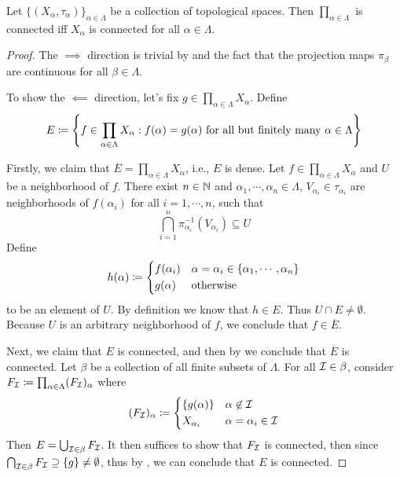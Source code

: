 \documentclass[screen]{techreport}
\numberwithin{equation}{section}
\begin{document}
\begin{theorem}\label{The:ProdConnIffEachConn}
	Let $\{(X_\alpha,\tau_\alpha)\}_{\alpha \in \Lambda}$ be a collection of topological spaces.
	Then $\prod_{\alpha \in \Lambda}$ is connected iff $X_\alpha$ is connected for all $\alpha \in \Lambda$.
\end{theorem}
\begin{proof}
	The $\implies$ direction is trivial by  and the fact that the projection maps $\pi_\beta$ are continuous for all $\beta \in \Lambda$.
	
	To show the $\impliedby$ direction, let's fix $g \in \prod_{\alpha \in \Lambda} X_\alpha$. Define
	\[
	E \coloneqq \left\{ { f \in \prod_{\alpha \in \Lambda} X_\alpha : f(\alpha)=g(\alpha)~\text{for all but finitely many $\alpha \in \Lambda$} } \right\}
	\]
	
	Firstly, we claim that $\overline{E} = \prod_{\alpha \in \Lambda} X_\alpha$, i.e., $E$ is dense.
	Let $f \in \prod_{\alpha \in \Lambda} X_\alpha$ and $U$ be a neighborhood of $f$.
	There exist $n \in \mathbb{N}$ and $\alpha_1,\cdots,\alpha_n \in \Lambda$, $V_{\alpha_i} \in \tau_{\alpha_i}$ are neighborhoods of $f(\alpha_i)$ for all $i=1,\cdots,n$, such that
	\[
	\bigcap_{i=1}^n \pi_{\alpha_i}^{-1}(V_{\alpha_i}) \subseteq U
	\]
	Define
	\[
	h(\alpha) \coloneqq \begin{dcases}
 		f(\alpha_i) & \alpha=\alpha_i  \in \{ \alpha_1,\cdots, \alpha_n \} \\
 		g(\alpha) & \text{otherwise}
 	\end{dcases}
	\]
	to be an element of $U$.
	By definition we know that $h \in E$.
	Thus $U \cap E \neq \emptyset$.
	Because $U$ is an arbitrary neighborhood of $f$, we conclude that $f \in \overline{E}$.
	
	Next, we claim that $E$ is connected, and then by  we conclude that $\overline{E}$ is connected.
	Let $\beta$ be a collection of all finite subsets of $\Lambda$.
	For all $\mathcal{I} \in \beta$, consider $F_{\mathcal{I}} \coloneqq \prod_{\alpha \in \Lambda} (F_{\mathcal{I}})_\alpha$ where
	\[
	(F_{\mathcal{I}})_\alpha \coloneqq \begin{dcases}
 		\{ g(\alpha)\} & \alpha \not\in \mathcal{I} \\
 		X_{\alpha_i} & \alpha=\alpha_i \in \mathcal{I}
 	\end{dcases}
	\]
	Then $E = \bigcup_{\mathcal{I} \in \beta} F_{\mathcal{I}}$.
	It then suffices to show that $F_{\mathcal{I}}$ is connected, then since $\bigcap_{\mathcal{I} \in \beta} F_{\mathcal{I}} \supseteq \{g\} \neq \emptyset$, thus by , we can conclude that $E$ is connected.
	

\end{proof}
\end{document}

